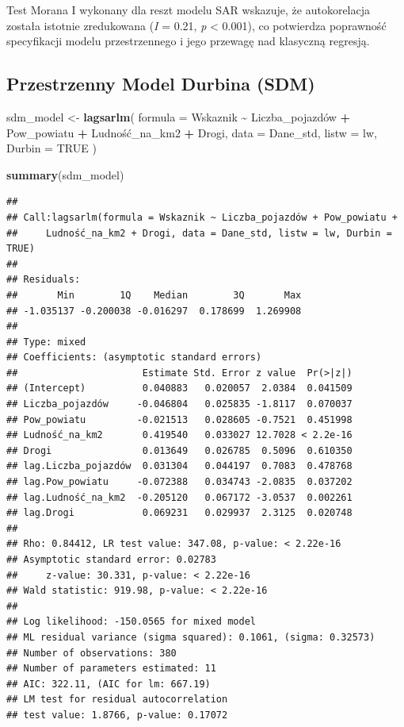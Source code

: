 \documentclass[
  11pt,
]{article}
\newenvironment{Shaded}{\begin{snugshade}}{\end{snugshade}}
\newcommand{\AttributeTok}[1]{\textcolor[rgb]{0.13,0.29,0.53}{#1}}
\newcommand{\ConstantTok}[1]{\textcolor[rgb]{0.56,0.35,0.01}{#1}}
\newcommand{\FunctionTok}[1]{\textcolor[rgb]{0.13,0.29,0.53}{\textbf{#1}}}
\newcommand{\NormalTok}[1]{#1}
\newcommand{\OtherTok}[1]{\textcolor[rgb]{0.56,0.35,0.01}{#1}}
\newcommand{\SpecialCharTok}[1]{\textcolor[rgb]{0.81,0.36,0.00}{\textbf{#1}}}
\begin{document}
Test Morana I wykonany dla reszt modelu SAR wskazuje, że autokorelacja
została istotnie zredukowana (\emph{I} = 0.21, \emph{p} \textless{}
0.001), co potwierdza poprawność specyfikacji modelu przestrzennego i
jego przewagę nad klasyczną regresją.

\subsection{Przestrzenny Model Durbina
(SDM)}\label{przestrzenny-model-durbina-sdm}

\begin{Shaded}
\begin{Highlighting}[]
\NormalTok{sdm\_model }\OtherTok{\textless{}{-}} \FunctionTok{lagsarlm}\NormalTok{(}
  \AttributeTok{formula =}\NormalTok{ Wskaznik }\SpecialCharTok{\textasciitilde{}}\NormalTok{ Liczba\_pojazdów }\SpecialCharTok{+}
\NormalTok{    Pow\_powiatu }\SpecialCharTok{+}
\NormalTok{    Ludność\_na\_km2 }\SpecialCharTok{+}
\NormalTok{    Drogi,}
    \AttributeTok{data =}\NormalTok{ Dane\_std,}
  \AttributeTok{listw =}\NormalTok{ lw,}
  \AttributeTok{Durbin =} \ConstantTok{TRUE}
\NormalTok{)}

\FunctionTok{summary}\NormalTok{(sdm\_model)}
\end{Highlighting}
\end{Shaded}

\begin{verbatim}
## 
## Call:lagsarlm(formula = Wskaznik ~ Liczba_pojazdów + Pow_powiatu + 
##     Ludność_na_km2 + Drogi, data = Dane_std, listw = lw, Durbin = TRUE)
## 
## Residuals:
##       Min        1Q    Median        3Q       Max 
## -1.035137 -0.200038 -0.016297  0.178699  1.269908 
## 
## Type: mixed 
## Coefficients: (asymptotic standard errors) 
##                      Estimate Std. Error z value  Pr(>|z|)
## (Intercept)          0.040883   0.020057  2.0384  0.041509
## Liczba_pojazdów     -0.046804   0.025835 -1.8117  0.070037
## Pow_powiatu         -0.021513   0.028605 -0.7521  0.451998
## Ludność_na_km2       0.419540   0.033027 12.7028 < 2.2e-16
## Drogi                0.013649   0.026785  0.5096  0.610350
## lag.Liczba_pojazdów  0.031304   0.044197  0.7083  0.478768
## lag.Pow_powiatu     -0.072388   0.034743 -2.0835  0.037202
## lag.Ludność_na_km2  -0.205120   0.067172 -3.0537  0.002261
## lag.Drogi            0.069231   0.029937  2.3125  0.020748
## 
## Rho: 0.84412, LR test value: 347.08, p-value: < 2.22e-16
## Asymptotic standard error: 0.02783
##     z-value: 30.331, p-value: < 2.22e-16
## Wald statistic: 919.98, p-value: < 2.22e-16
## 
## Log likelihood: -150.0565 for mixed model
## ML residual variance (sigma squared): 0.1061, (sigma: 0.32573)
## Number of observations: 380 
## Number of parameters estimated: 11 
## AIC: 322.11, (AIC for lm: 667.19)
## LM test for residual autocorrelation
## test value: 1.8766, p-value: 0.17072
\end{verbatim}
\end{document}
